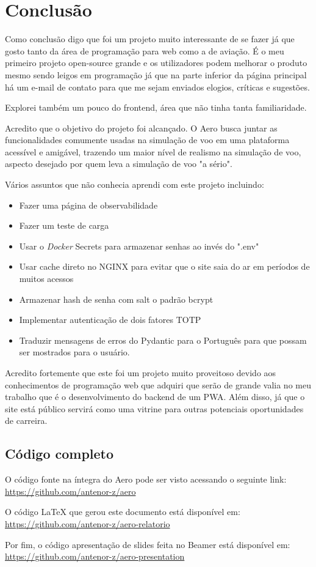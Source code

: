 \chapter{Conclusão}

Como conclusão digo que foi um projeto muito interessante de se fazer já que 
gosto tanto da área de programação para web como a de aviação. É o meu primeiro 
projeto open-source grande e os utilizadores podem melhorar o produto mesmo sendo
leigos em programação já que na parte inferior da página principal há um e-mail 
de contato para que me sejam enviados elogios, críticas e sugestões.

Explorei também um pouco do frontend, área que não tinha tanta familiaridade.

Acredito que o objetivo do projeto foi alcançado. O Aero busca juntar as funcionalidades 
comumente usadas na simulação de voo em uma plataforma acessível e amigável, 
trazendo um maior nível de realismo na simulação de voo, aspecto desejado por quem leva
a simulação de voo "a sério".

Vários assuntos que não conhecia aprendi com este projeto incluindo:

\begin{itemize}
\item Fazer uma página de observabilidade
\item Fazer um teste de carga
\item Usar o \textit{Docker} Secrets para armazenar senhas ao invés do ".env"
\item Usar cache direto no NGINX para evitar que o site saia do ar em períodos 
de muitos acessos
\item Armazenar hash de senha com salt o padrão bcrypt
\item Implementar autenticação de dois fatores TOTP
\item Traduzir mensagens de erros do Pydantic para o Português para que possam 
ser mostrados para o usuário.
\end{itemize}

Acredito fortemente que este foi um projeto muito proveitoso devido aos 
conhecimentos de programação web que adquiri que serão de grande valia no meu 
trabalho que é o desenvolvimento do backend de um PWA. Além disso, já que o site está público 
servirá como uma vitrine para outras potenciais oportunidades de carreira.

\section {Código completo}

O código fonte na íntegra do Aero pode ser visto acessando o seguinte link: \url{https://github.com/antenor-z/aero}

O código LaTeX que gerou este documento está disponível em: \url{https://github.com/antenor-z/aero-relatorio}

Por fim, o código apresentação de slides feita no Beamer está disponível em: \url{https://github.com/antenor-z/aero-presentation}